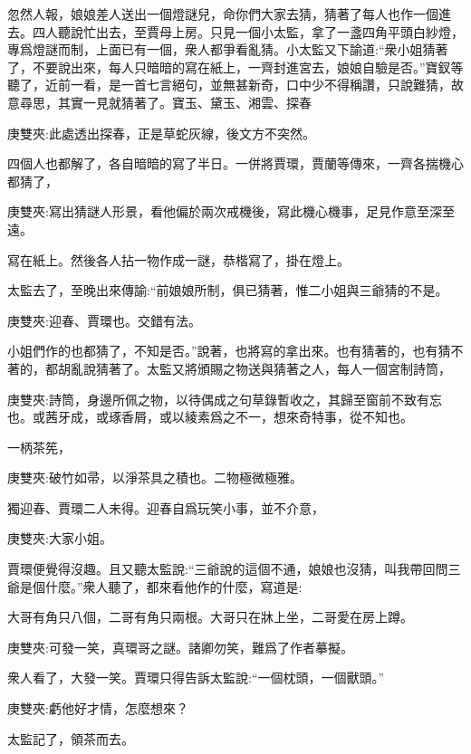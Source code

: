\begin{parag}
    忽然人報，娘娘差人送出一個燈謎兒，命你們大家去猜，猜著了每人也作一個進去。四人聽說忙出去，至賈母上房。只見一個小太監，拿了一盞四角平頭白紗燈，專爲燈謎而制，上面已有一個，衆人都爭看亂猜。小太監又下諭道:“衆小姐猜著了，不要說出來，每人只暗暗的寫在紙上，一齊封進宮去，娘娘自驗是否。”寶釵等聽了，近前一看，是一首七言絕句，並無甚新奇，口中少不得稱讚，只說難猜，故意尋思，其實一見就猜著了。寶玉、黛玉、湘雲、探春\begin{note}庚雙夾:此處透出探春，正是草蛇灰線，後文方不突然。\end{note}四個人也都解了，各自暗暗的寫了半日。一併將賈環，賈蘭等傳來，一齊各揣機心都猜了，\begin{note}庚雙夾:寫出猜謎人形景，看他偏於兩次戒機後，寫此機心機事，足見作意至深至遠。\end{note}寫在紙上。然後各人拈一物作成一謎，恭楷寫了，掛在燈上。
\end{parag}


\begin{parag}
    太監去了，至晚出來傳諭:“前娘娘所制，俱已猜著，惟二小姐與三爺猜的不是。\begin{note}庚雙夾:迎春、賈環也。交錯有法。\end{note}小姐們作的也都猜了，不知是否。”說著，也將寫的拿出來。也有猜著的，也有猜不著的，都胡亂說猜著了。太監又將頒賜之物送與猜著之人，每人一個宮制詩筒，\begin{note}庚雙夾:詩筒，身邊所佩之物，以待偶成之句草錄暫收之，其歸至窗前不致有忘也。或茜牙成，或琢香屑，或以綾素爲之不一，想來奇特事，從不知也。\end{note}一柄茶筅，\begin{note}庚雙夾:破竹如帚，以淨茶具之積也。二物極微極雅。\end{note}獨迎春、賈環二人未得。迎春自爲玩笑小事，並不介意，\begin{note}庚雙夾:大家小姐。\end{note}賈環便覺得沒趣。且又聽太監說:“三爺說的這個不通，娘娘也沒猜，叫我帶回問三爺是個什麼。”衆人聽了，都來看他作的什麼，寫道是:
\end{parag}


\begin{parag}
    大哥有角只八個，二哥有角只兩根。大哥只在牀上坐，二哥愛在房上蹲。\begin{note}庚雙夾:可發一笑，真環哥之謎。諸卿勿笑，難爲了作者摹擬。\end{note}
\end{parag}


\begin{parag}
    衆人看了，大發一笑。賈環只得告訴太監說:“一個枕頭，一個獸頭。”\begin{note}庚雙夾:虧他好才情，怎麼想來？\end{note}太監記了，領茶而去。
\end{parag}


